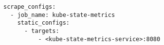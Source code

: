 \begin{verbatim}
scrape_configs:
  - job_name: kube-state-metrics
    static_configs:
      - targets:
          - <kube-state-metrics-service>:8080
\end{verbatim}